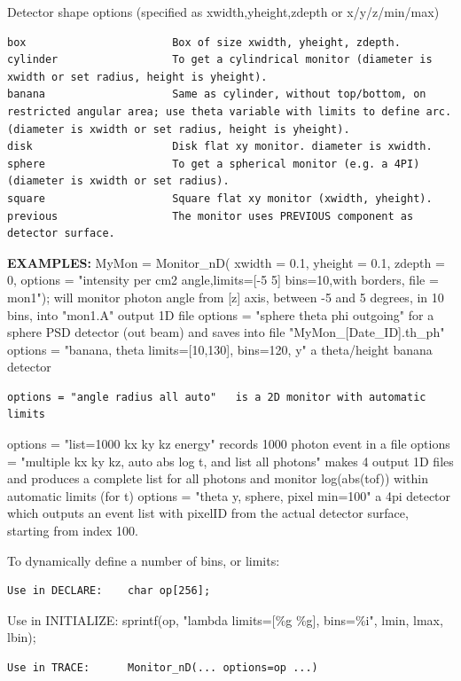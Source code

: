 Detector shape options (specified as xwidth,yheight,zdepth or x/y/z/min/max)

\begin{verbatim}
box                       Box of size xwidth, yheight, zdepth.
cylinder                  To get a cylindrical monitor (diameter is xwidth or set radius, height is yheight).
banana                    Same as cylinder, without top/bottom, on restricted angular area; use theta variable with limits to define arc. (diameter is xwidth or set radius, height is yheight).
disk                      Disk flat xy monitor. diameter is xwidth.
sphere                    To get a spherical monitor (e.g. a 4PI) (diameter is xwidth or set radius).
square                    Square flat xy monitor (xwidth, yheight).
previous                  The monitor uses PREVIOUS component as detector surface.
\end{verbatim}

\textbf{EXAMPLES:} MyMon = Monitor\_nD( xwidth = 0.1, yheight = 0.1, zdepth = 0, options = "intensity per cm2 angle,limits=[-5 5] bins=10,with borders, file = mon1"); will monitor photon angle from [z] axis, between -5 and 5 degrees, in 10 bins, into "mon1.A" output 1D file options = "sphere theta phi outgoing" for a sphere PSD detector (out beam) and saves into file "MyMon\_[Date\_ID].th\_ph" options = "banana, theta limits=[10,130], bins=120, y" a theta/height banana detector

\begin{verbatim}
options = "angle radius all auto"   is a 2D monitor with automatic limits
\end{verbatim}

options = "list=1000 kx ky kz energy" records 1000 photon event in a file options = "multiple kx ky kz, auto abs log t, and list all photons" makes 4 output 1D files and produces a complete list for all photons and monitor log(abs(tof)) within automatic limits (for t) options = "theta y, sphere, pixel min=100" a 4pi detector which outputs an event list with pixelID from the actual detector surface, starting from index 100.

To dynamically define a number of bins, or limits:

\begin{verbatim}
Use in DECLARE:    char op[256];
\end{verbatim}

Use in INITIALIZE: sprintf(op, "lambda limits=[\%g \%g], bins=\%i", lmin, lmax, lbin);

\begin{verbatim}
Use in TRACE:      Monitor_nD(... options=op ...)
\end{verbatim}

